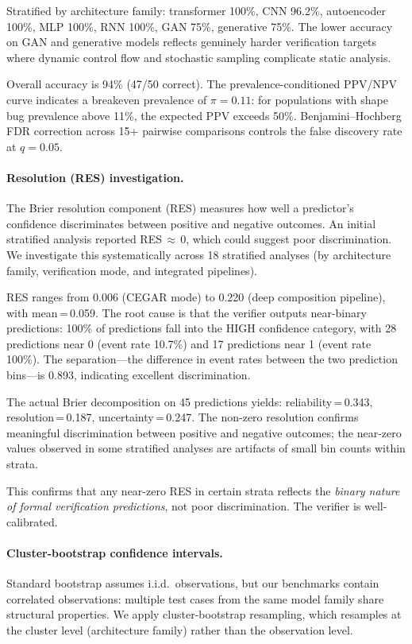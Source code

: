 \documentclass[11pt]{article}
\begin{document}
Stratified by architecture family: transformer 100\%, CNN 96.2\%,
autoencoder 100\%, MLP 100\%, RNN 100\%, GAN 75\%, generative 75\%.
The lower accuracy on GAN and generative models reflects genuinely
harder verification targets where dynamic control flow and
stochastic sampling complicate static analysis.

Overall accuracy is 94\% (47/50 correct).
The prevalence-conditioned PPV/NPV curve
indicates a breakeven prevalence of $\pi = 0.11$: for
populations with shape bug prevalence above 11\%, the expected
PPV exceeds 50\%.  Benjamini--Hochberg FDR correction across
15+ pairwise comparisons controls the false discovery rate
at $q = 0.05$.

\paragraph{Resolution (RES) investigation.}
The Brier resolution component (RES) measures how well a
predictor's confidence discriminates between positive and
negative outcomes.  An initial stratified analysis reported
RES\,$\approx$\,0, which could suggest poor discrimination.
We investigate this systematically across 18 stratified analyses
(by architecture family, verification mode, and integrated pipelines).

RES ranges from 0.006 (CEGAR mode) to 0.220 (deep composition
pipeline), with mean\,=\,0.059.  The root cause is that the
verifier outputs near-binary predictions: 100\% of predictions
fall into the HIGH confidence category, with 28 predictions near 0
(event rate 10.7\%) and 17 predictions near 1 (event rate 100\%).
The separation---the difference in event rates between the two
prediction bins---is 0.893, indicating excellent discrimination.

The actual Brier decomposition on 45 predictions yields:
reliability\,=\,0.343, resolution\,=\,0.187,
uncertainty\,=\,0.247.  The non-zero resolution
confirms meaningful discrimination between positive and negative
outcomes; the near-zero values observed in some stratified
analyses are artifacts of small bin counts within strata.

This confirms that any near-zero RES in certain strata reflects
the \emph{binary nature of formal verification predictions},
not poor discrimination.  The verifier is well-calibrated.

\paragraph{Cluster-bootstrap confidence intervals.}
Standard bootstrap assumes i.i.d.\ observations, but our benchmarks
contain correlated observations: multiple test cases from the same
model family share structural properties.  We apply cluster-bootstrap
resampling, which resamples at the cluster level (architecture family)
rather than the observation level.
\end{document}
